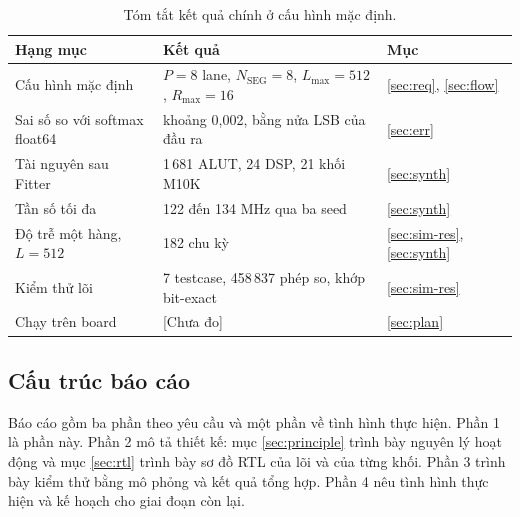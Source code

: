 \begin{table}[htbp]
\centering
\small
\begin{tabular}{lll}
\toprule
Hạng mục & Kết quả & Mục \\
\midrule
Cấu hình mặc định & $P = 8$ lane, $N_{\text{SEG}} = 8$, $L_{\max} = 512$, $R_{\max} = 16$ & \ref{sec:req}, \ref{sec:flow} \\
Sai số so với softmax float64 & khoảng 0,002, bằng nửa LSB của đầu ra & \ref{sec:err} \\
Tài nguyên sau Fitter & 1\,681 ALUT, 24 DSP, 21 khối M10K & \ref{sec:synth} \\
Tần số tối đa & 122 đến 134 MHz qua ba seed & \ref{sec:synth} \\
Độ trễ một hàng, $L = 512$ & 182 chu kỳ & \ref{sec:sim-res}, \ref{sec:synth} \\
Kiểm thử lõi & 7 testcase, 458\,837 phép so, khớp bit-exact & \ref{sec:sim-res} \\
Chạy trên board & [Chưa đo] & \ref{sec:plan} \\
\bottomrule
\end{tabular}
\caption{Tóm tắt kết quả chính ở cấu hình mặc định.}
\label{tab:summary}
\end{table}

\subsection{Cấu trúc báo cáo}

Báo cáo gồm ba phần theo yêu cầu và một phần về tình hình thực hiện. Phần 1 là phần này. Phần 2 mô tả thiết kế: mục \ref{sec:principle} trình bày nguyên lý hoạt động và mục \ref{sec:rtl} trình bày sơ đồ RTL của lõi và của từng khối. Phần 3 trình bày kiểm thử bằng mô phỏng và kết quả tổng hợp. Phần 4 nêu tình hình thực hiện và kế hoạch cho giai đoạn còn lại.
